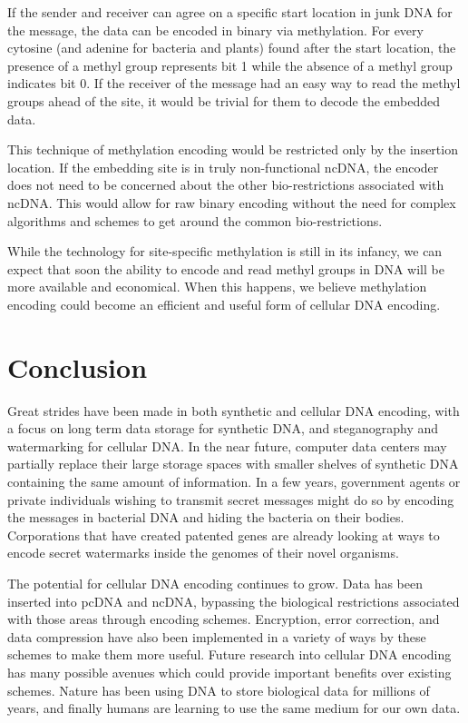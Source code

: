 \documentclass{bioinfo}
\begin{document}
If the sender and receiver can agree on a specific start location in junk DNA for the message, the data can be encoded in binary via methylation. For every cytosine (and adenine for bacteria and plants) found after the start location, the presence of a methyl group represents bit 1 while the absence of a methyl group indicates bit 0. If the receiver of the message had an easy way to read the methyl groups ahead of the site, it would be trivial for them to decode the embedded data.

This technique of methylation encoding would be restricted only by the insertion location. If the embedding site is in truly non-functional ncDNA, the encoder does not need to be concerned about the other bio-restrictions associated with ncDNA. This would allow for raw binary encoding without the need for complex algorithms and schemes to get around the common bio-restrictions.

While the technology for site-specific methylation is still in its infancy, we can expect that soon the ability to encode and read methyl groups in DNA will be more available and economical. When this happens, we believe methylation encoding could become an efficient and useful form of cellular DNA encoding.

\section{Conclusion}

Great strides have been made in both synthetic and cellular DNA encoding, with a focus on long term data storage for synthetic DNA, and steganography and watermarking for cellular DNA. In the near future, computer data centers may partially replace their large storage spaces with smaller shelves of synthetic DNA containing the same amount of information. In a few years, government agents or private individuals wishing to transmit secret messages might do so by encoding the messages in bacterial DNA and hiding the bacteria on their bodies. Corporations that have created patented genes are already looking at ways to encode secret watermarks inside the genomes of their novel organisms.

The potential for cellular DNA encoding continues to grow. Data has been inserted into pcDNA and ncDNA, bypassing the biological restrictions associated with those areas through encoding schemes. Encryption, error correction, and data compression have also been implemented in a variety of ways by these schemes to make them more useful. Future research into cellular DNA encoding has many possible avenues which could provide important benefits over existing schemes. Nature has been using DNA to store biological data for millions of years, and finally humans are learning to use the same medium for our own data.

%
%
%

%




\end{document}
